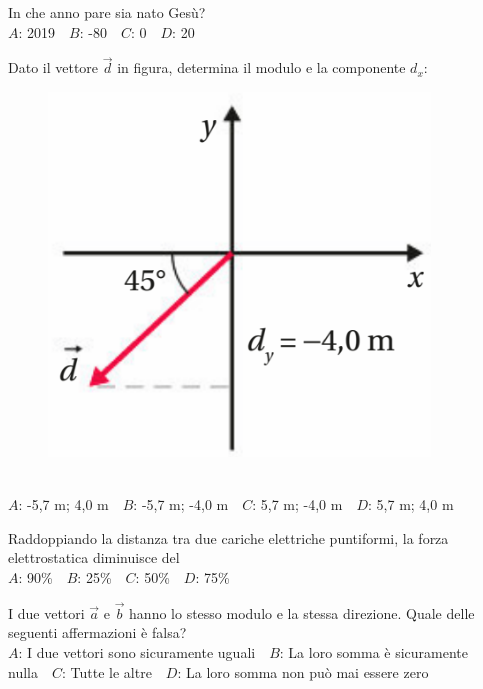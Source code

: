 \mcquestionfooter



\def\mcquestionnumber{5}


\mcquestionheader In che anno pare sia nato Gesù?\\
{$A$}: 2019\ \ {$B$}: -80\ \ {$C$}: 0\ \ {$D$}: 20\ \ 

\mcquestionfooter



\def\mcquestionnumber{6}


\mcquestionheader Dato il vettore $\vec{d}$ in figura, determina il modulo e la componente $d_x$: \begin{figure}[h!]   \begin{center}     \includegraphics[scale=0.35]{vettored.png}   \end{center} \end{figure}\\
{$A$}: -5,7 m; 4,0 m\ \ {$B$}: -5,7 m; -4,0 m\ \ {$C$}: 5,7 m; -4,0 m\ \ {$D$}: 5,7 m; 4,0 m\ \ 

\mcquestionfooter



\def\mcquestionnumber{7}


\mcquestionheader Raddoppiando la distanza tra due cariche elettriche puntiformi, la forza elettrostatica diminuisce del\\
{$A$}: 90\%\ \ {$B$}: 25\%\ \ {$C$}: 50\%\ \ {$D$}: 75\%\ \ 

\mcquestionfooter



\def\mcquestionnumber{8}


\mcquestionheader I due vettori $\vec{a}$ e $\vec{b}$ hanno lo stesso modulo e la stessa direzione. Quale delle seguenti affermazioni è falsa?\\
{$A$}: I due vettori sono sicuramente uguali\ \ {$B$}: La loro somma è sicuramente nulla\ \ {$C$}: Tutte le altre\ \ {$D$}: La loro somma non può mai essere zero\ \ 

